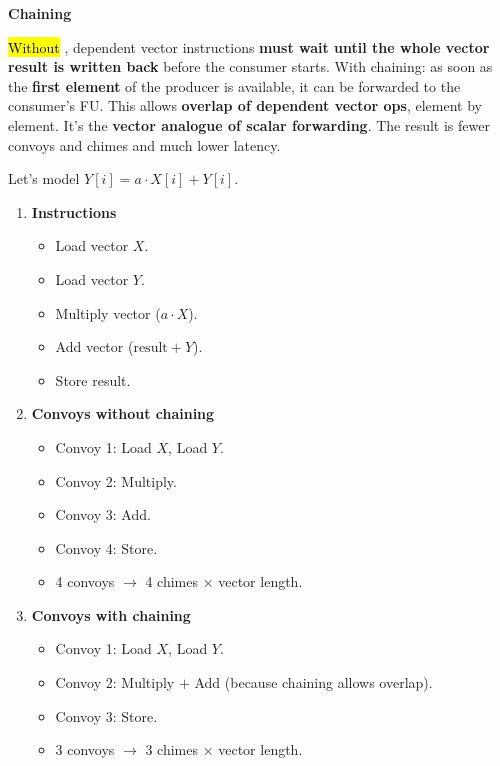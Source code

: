 \highspace
\begin{flushleft}
    \textcolor{Green3}{ \textbf{Chaining}}
\end{flushleft}
\hl{Without} , dependent vector instructions \textbf{must wait until the whole vector result is written back} before the consumer starts. With chaining: as soon as the \textbf{first element} of the producer is available, it can be forwarded to the consumer's FU. This allows \textbf{overlap of dependent vector ops}, element by element. It's the \textbf{vector analogue of scalar forwarding}. The result is fewer convoys and chimes and much lower latency.

\begin{examplebox}
    Let's model $Y[i] = a \cdot X[i] + Y[i]$.
    \begin{enumerate}
        \item \textbf{Instructions}
        \begin{itemize}
            \item Load vector $X$.
            \item Load vector $Y$.
            \item Multiply vector ($a \cdot X$).
            \item Add vector ($\text{result} + Y$).
            \item Store result.
        \end{itemize}
        \item \textbf{Convoys without chaining}
        \begin{itemize}
            \item Convoy 1: Load $X$, Load $Y$.
            \item Convoy 2: Multiply.
            \item Convoy 3: Add.
            \item Convoy 4: Store.
            \item 4 convoys $\rightarrow$ 4 chimes $\times$ vector length.
        \end{itemize}
        \item \textbf{Convoys with chaining}
        \begin{itemize}
            \item Convoy 1: Load $X$, Load $Y$.
            \item Convoy 2: Multiply $+$ Add (because chaining allows overlap).
            \item Convoy 3: Store.
            \item 3 convoys $\rightarrow$ 3 chimes $\times$ vector length.
        \end{itemize}
    \end{enumerate}
\end{examplebox}